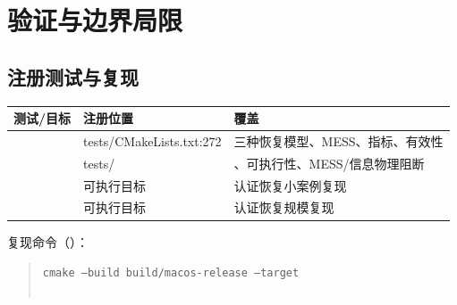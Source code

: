 \section{验证与边界局限}\label{sec:res-verify}

\subsection{注册测试与复现}
\begin{center}\footnotesize
\begin{tabular}{@{}L{5.6cm}L{4.0cm}L{5.0cm}@{}}
\toprule
测试/目标 & 注册位置 & 覆盖\\
\midrule
{} & tests/CMakeLists.txt:272 & 三种恢复模型、MESS、指标、有效性\\
 & tests/ & 、可执行性、MESS/信息物理阻断\\
 & 可执行目标 & 认证恢复小案例复现\\
 & 可执行目标 & 认证恢复规模复现\\
\bottomrule
\end{tabular}
\end{center}
复现命令（）：
\begin{quote}\footnotesize
\texttt{cmake --build build/macos-release --target}\\
\\
\end{quote}

